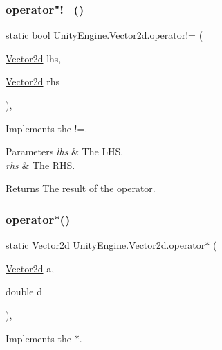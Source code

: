 \subsubsection{\texorpdfstring{operator"!=()}{operator!=()}}
{\footnotesize\ttfamily static bool Unity\+Engine.\+Vector2d.\+operator!= (\begin{DoxyParamCaption}\item[{\hyperlink{struct_unity_engine_1_1_vector2d}{Vector2d}}]{lhs,  }\item[{\hyperlink{struct_unity_engine_1_1_vector2d}{Vector2d}}]{rhs }\end{DoxyParamCaption})\hspace{0.3cm}{\ttfamily [inline]}, {\ttfamily [static]}}



Implements the !=. 


\begin{DoxyParams}{Parameters}
{\em lhs} & The L\+HS.\\
\hline
{\em rhs} & The R\+HS.\\
\hline
\end{DoxyParams}
\begin{DoxyReturn}{Returns}
The result of the operator.
\end{DoxyReturn}
\mbox{\label{struct_unity_engine_1_1_vector2d_a086e9765590c6e2d5048e4eb5af9bcfc}} 
\subsubsection{\texorpdfstring{operator$\ast$()}{operator*()}\hspace{0.1cm}{\footnotesize\ttfamily [1/2]}}
{\footnotesize\ttfamily static \hyperlink{struct_unity_engine_1_1_vector2d}{Vector2d} Unity\+Engine.\+Vector2d.\+operator$\ast$ (\begin{DoxyParamCaption}\item[{\hyperlink{struct_unity_engine_1_1_vector2d}{Vector2d}}]{a,  }\item[{double}]{d }\end{DoxyParamCaption})\hspace{0.3cm}{\ttfamily [inline]}, {\ttfamily [static]}}



Implements the $\ast$. 


